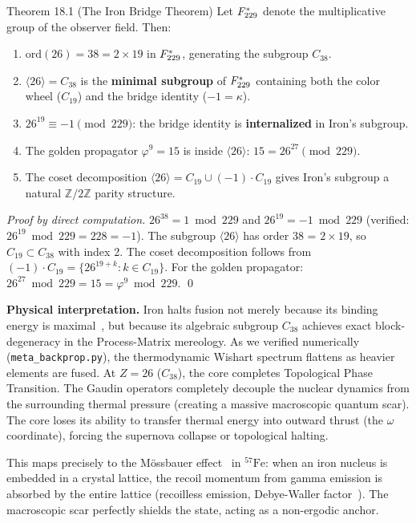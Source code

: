 \begin{theorembox}{Theorem 18.1 (The Iron Bridge Theorem)}
Let $F_{229}^* $ denote the multiplicative group of the observer field. Then:
\begin{enumerate}
    \item $\text{ord}(26) = 38 = 2 \times 19$ in $F_{229}^*$, generating the subgroup $C_{38}$.
    \item $\langle 26 \rangle = C_{38}$ is the \textbf{minimal subgroup} of $F_{229}^*$ containing both the color wheel ($C_{19}$) and the bridge identity ($-1 = \kappa$).
    \item $26^{19} \equiv -1 \pmod{229}$: the bridge identity is \textbf{internalized} in Iron's subgroup.
    \item The golden propagator $\varphi^9 = 15$ is inside $\langle 26 \rangle$: $15 = 26^{27} \pmod{229}$.
    \item The coset decomposition $\langle 26 \rangle = C_{19} \cup (-1) \cdot C_{19}$ gives Iron's subgroup a natural $\mathbb{Z}/2\mathbb{Z}$ parity structure.
\end{enumerate}
\end{theorembox}

\begin{proof}[Proof by direct computation]
$26^{38} = 1 \bmod 229$ and $26^{19} = -1 \bmod 229$ (verified: $26^{19} \bmod 229 = 228 = -1$). The subgroup $\langle 26 \rangle$ has order 38 = $2 \times 19$, so $C_{19} \subset C_{38}$ with index 2. The coset decomposition follows from $(-1) \cdot C_{19} = \{26^{19+k} : k \in C_{19}\}$. For the golden propagator: $26^{27} \bmod 229 = 15 = \varphi^9 \bmod 229$. \qed
\end{proof}

\noindent \textbf{Physical interpretation.} Iron halts fusion not merely because its binding energy is maximal~\cite{Fewell1995BindingEnergy}, but because its algebraic subgroup $C_{38}$ achieves exact block-degeneracy in the Process-Matrix mereology. As we verified numerically (\texttt{meta\_backprop.py}), the thermodynamic Wishart spectrum flattens as heavier elements are fused. At $Z=26$ ($C_{38}$), the core completes Topological Phase Transition. The Gaudin operators completely decouple the nuclear dynamics from the surrounding thermal pressure (creating a massive macroscopic quantum scar). The core loses its ability to transfer thermal energy into outward thrust (the $\omega$ coordinate), forcing the supernova collapse or topological halting.

This maps precisely to the Mössbauer effect~\cite{Mossbauer1958} in $^{57}\text{Fe}$: when an iron nucleus is embedded in a crystal lattice, the recoil momentum from gamma emission is absorbed by the entire lattice (recoilless emission, Debye-Waller factor~\cite{DebyeWaller1913}). The macroscopic scar perfectly shields the state, acting as a non-ergodic anchor.

